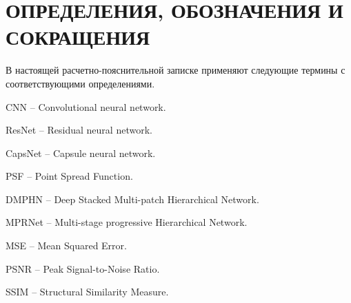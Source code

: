 \part*{ОПРЕДЕЛЕНИЯ, ОБОЗНАЧЕНИЯ И\\СОКРАЩЕНИЯ}
В настоящей расчетно-пояснительной записке применяют следующие термины с соответствующими определениями.

\begin{enumdescript}
	\item[CNN] -- Convolutional neural network.
	\item[ResNet] -- Residual neural network.
	\item[CapsNet] -- Capsule neural network.
	\item[PSF] -- Point Spread Function.
	\item[DMPHN] -- Deep Stacked Multi-patch Hierarchical Network.
	\item[MPRNet] -- Multi-stage progressive Hierarchical Network.
	\item[MSE] -- Mean Squared Error.
	\item[PSNR] -- Peak Signal-to-Noise Ratio.
	\item[SSIM] -- Structural Similarity Measure.
\end{enumdescript}
